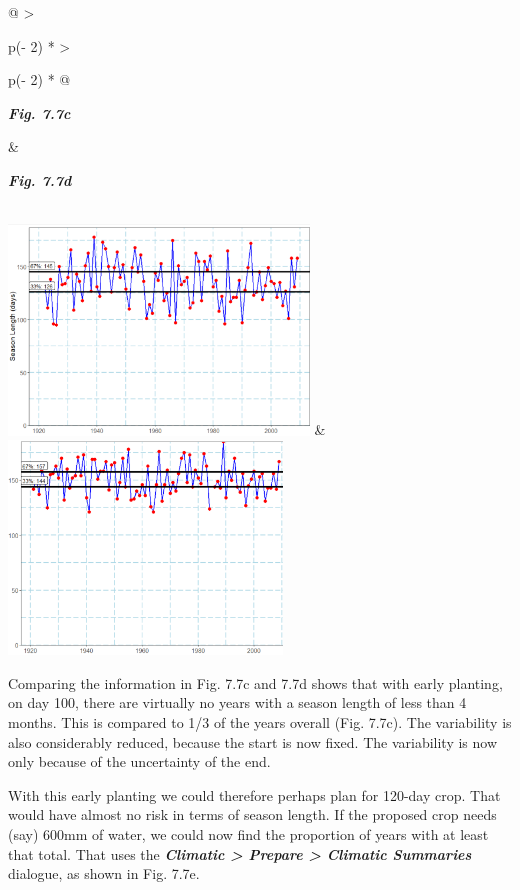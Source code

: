 \documentclass[
  letterpaper,
  DIV=11,
  numbers=noendperiod]{scrreprt}
\begin{document}
\begin{longtable}[]{@{}
  >{\raggedright\arraybackslash}p{(\columnwidth - 2\tabcolsep) * }
  >{\raggedright\arraybackslash}p{(\columnwidth - 2\tabcolsep) * }@{}}
\toprule\noalign{}
\begin{minipage}[b]{\linewidth}\raggedright
\textbf{\emph{Fig. 7.7c}}
\end{minipage} & \begin{minipage}[b]{\linewidth}\raggedright
\textbf{\emph{Fig. 7.7d}}
\end{minipage} \\
\midrule\noalign{}
\endhead
\bottomrule\noalign{}
\endlastfoot
\includegraphics[width=3.14457in,height=2.20183in]{figures/Fig7.7c.png}
&
\includegraphics[width=2.86213in,height=2.23999in]{figures/Fig7.7d.png} \\
\end{longtable}

Comparing the information in Fig. 7.7c and 7.7d shows that with early
planting, on day 100, there are virtually no years with a season length
of less than 4 months. This is compared to 1/3 of the years overall
(Fig. 7.7c). The variability is also considerably reduced, because the
start is now fixed. The variability is now only because of the
uncertainty of the end.

With this early planting we could therefore perhaps plan for 120-day
crop. That would have almost no risk in terms of season length. If the
proposed crop needs (say) 600mm of water, we could now find the
proportion of years with at least that total. That uses the
\textbf{\emph{Climatic \textgreater{} Prepare \textgreater{} Climatic
Summaries}} dialogue, as shown in Fig. 7.7e.
\end{document}
